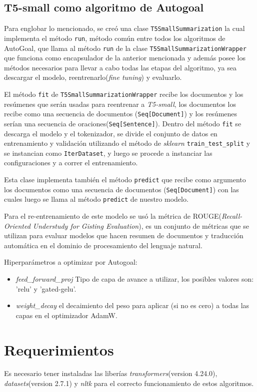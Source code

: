 \subsection{T5-small como algoritmo de Autogoal}
Para englobar lo mencionado, se creó una clase \texttt{T5SmallSummarization} la cual implementa el método \texttt{run}, método común entre todos los algoritmos de AutoGoal, que llama al método \texttt{run} de la clase \texttt{T5SmallSummarizationWrapper} que funciona como encapsulador de la anterior mencionada y además posee los métodos necesarios para llevar a cabo todas las etapas del algoritmo, ya sea descargar el modelo, reentrenarlo(\textit{fine tuning}) y evaluarlo.

El método \texttt{fit} de \texttt{T5SmallSummarizationWrapper} recibe los documentos y los resúmenes que serán usadas para reentrenar a \textit{T5-small}, los documentos los recibe como una secuencia de documentos (\texttt{Seq[Document]}) y los resúmenes serían una secuencia de oraciones(\texttt{Seq[Sentence]}). Dentro del método \texttt{fit} se descarga el modelo y el tokenizador, se divide el conjunto de datos en entrenamiento y validación utilizando el método de \textit{sklearn} \texttt{train\_test\_split} y se instancian como \texttt{IterDataset}, y luego se procede a instanciar las configuraciones y a correr el entrenamiento.

Esta clase implementa también el método \texttt{predict} que recibe como argumento los documentos como una secuencia de documentos (\texttt{Seq[Document]}) con las cuales luego se llama al método \texttt{predict} de nuestro modelo.

Para el re-entrenamiento de este modelo se usó la métrica de ROUGE(\textit{Recall-Oriented Understudy for Gisting Evaluation}), es un conjunto de métricas que se utilizan para evaluar modelos que hacen resumen de documentos y traducción automática en el dominio de procesamiento del lenguaje natural.

Hiperparámetros a optimizar por Autogoal:
\begin{itemize}
    \item \textit{feed\_forward\_proj} Tipo de capa de avance a utilizar, los posibles valores son: 'relu' y 'gated-gelu'.
    \item \textit{weight\_decay} el decaimiento del peso para aplicar (si no es cero) a todas las capas en el optimizador AdamW.
\end{itemize}

\section{Requerimientos}
Es necesario tener instaladas las liberías \textit{transformers}(version 4.24.0), \textit{datasets}(version 2.7.1) y \textit{nltk} para el correcto funcionamiento de estos algoritmos.